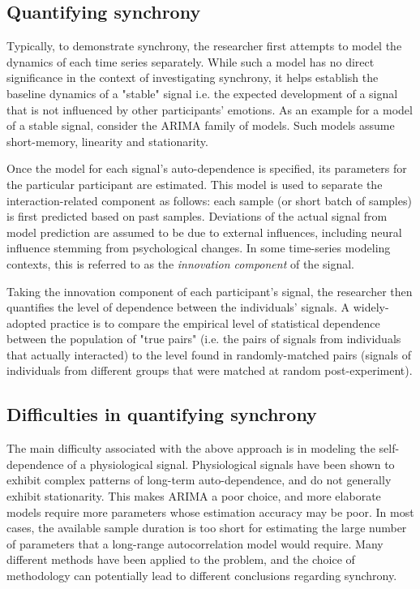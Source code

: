 \documentclass[a4paper, 11pt]{article}      %
\begin{document}
\subsection{Quantifying synchrony}
Typically, to demonstrate synchrony, the researcher first attempts to model the dynamics of each time series separately. While such a model has no direct significance in the context of investigating synchrony, it helps establish the  baseline dynamics of a "stable" signal i.e. the expected development of a signal that is not influenced by other participants' emotions. As an example for a model of a stable signal, consider the ARIMA family of models. Such models assume short-memory, linearity and stationarity. 

Once the model for each signal's auto-dependence is specified, its parameters for the particular participant are estimated. This model is used to separate the interaction-related component as follows: each sample (or short batch of samples) is first predicted based on past samples. Deviations of the actual signal from model prediction are assumed to be due to external influences, including neural influence stemming from psychological changes. In some time-series modeling contexts, this is referred to as the \emph{innovation component} of the signal. 

Taking the innovation component of each participant's signal, the researcher then quantifies the level of dependence between the individuals' signals. A widely-adopted practice is to compare the empirical level of statistical dependence between the population of "true pairs" (i.e. the pairs of signals from individuals that actually interacted) to the level found in randomly-matched pairs (signals of individuals from different groups that were matched at random post-experiment).

\subsection{Difficulties in quantifying synchrony}
The main difficulty associated with the above approach is in modeling the self-dependence of a physiological signal. Physiological signals have been shown to exhibit complex patterns of long-term auto-dependence, and do not generally exhibit stationarity. This makes ARIMA a poor choice, and more elaborate models require more parameters whose estimation accuracy may be poor. In most cases, the available sample duration is too short for estimating the large number of parameters that a long-range autocorrelation model would require. Many different methods have been applied to the problem, and the choice of methodology can potentially lead to different conclusions regarding synchrony.
\end{document}

